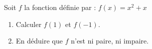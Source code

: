 \begin{Application}[][10 min]
Soit $f$ la fonction définie par : $f(x) = x^2 + x$
\begin{enumerate}
    \item Calculer $f(1)$ et $f(-1)$.
    \item En déduire que $f$ n'est ni paire, ni impaire.
\end{enumerate}
\end{Application}
